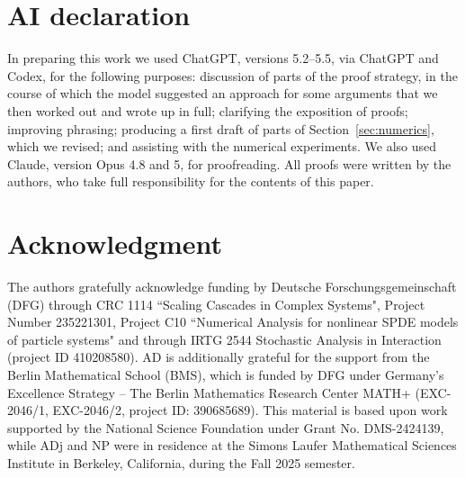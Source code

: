 \documentclass[a4paper,12pt]{article}
\begin{document}
\section*{AI declaration}
In preparing this work we used ChatGPT, versions 5.2--5.5, via ChatGPT and Codex, for the following purposes: discussion of parts of the proof strategy, in the course of which the model suggested an approach for some arguments that we then worked out and wrote up in full; clarifying the exposition of proofs; improving phrasing; producing a first draft of parts of Section~\ref{sec:numerics}, which we revised; and assisting with the numerical experiments. We also used Claude, version Opus 4.8 and 5, for proofreading. All proofs were written by the authors, who take full responsibility for the contents of this paper.


\section*{Acknowledgment}
The authors gratefully acknowledge funding   by Deutsche Forschungsgemeinschaft (DFG)  through  CRC 1114 ``Scaling Cascades in Complex Systems", Project Number 235221301, Project C10 ``Numerical
Analysis for nonlinear SPDE models of particle systems" and through  IRTG 2544 Stochastic Analysis in Interaction (project ID 410208580). AD is additionally grateful for the support from the Berlin Mathematical School (BMS), which is
funded by DFG under Germany's Excellence Strategy – The Berlin Mathematics 
Research Center MATH+ (EXC-2046/1, EXC-2046/2, project ID: 390685689). This material is based upon work supported by the National Science Foundation under Grant No. DMS-2424139, while ADj and NP were in residence at the Simons Laufer Mathematical Sciences Institute in Berkeley, California, during the Fall 2025 semester.


 
\end{document}

